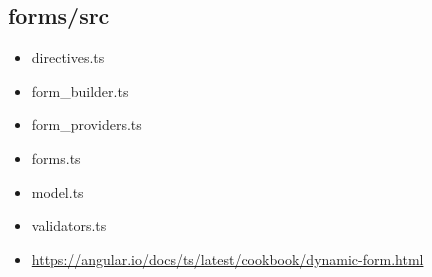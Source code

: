 \subsection{forms/src}


\begin{itemize}
  \item directives.ts
  \item form\_builder.ts
  \item form\_providers.ts
  \item forms.ts
  \item model.ts
  \item validators.ts
\end{itemize}









\begin{itemize}
  \item \url{https://angular.io/docs/ts/latest/cookbook/dynamic-form.html}
\end{itemize}





